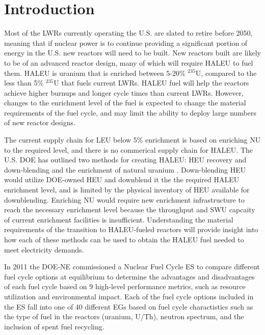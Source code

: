\section{Introduction}

Most of the \glspl{LWR} currently operating the U.S. are slated to retire
before 2050, meaning that if nuclear power is to continue providing a 
significant portion of energy in the U.S. new reactors will need to be built. 
New reactors built are likely to be of an advanced reactor design, many of 
which will require \gls{HALEU} to fuel them. \gls{HALEU} is uranium that 
is enriched between 5-20\% $^{235}$U, compared to the less than 5\% $^{235}$U 
that fuels current \glspl{LWR}. \gls{HALEU} fuel will help 
the reactors achieve higher burnups and longer cycle times than current 
\glspl{LWR}. However, changes to the enrichment level of the fuel is expected 
to change the material requirements of the fuel cycle, and may limit the 
ability to deploy large numbers of new reactor designs. 

The current supply chain for \gls{LEU} below 5\% enrichment is based on 
enriching \gls{NU} to the required level, and there is no commerical 
supply chain for \gls{HALEU}. The U.S. \gls{DOE} has outlined 
two methods for creating \gls{HALEU}: \gls{HEU} recovery and down-blending 
and the enrichment of natural uranium \cite{griffith_overview_2020}. 
Down-blending \gls{HEU} would utilize \gls{DOE}-owned \gls{HEU} and 
downblend it the the required \gls{HALEU} enrichment level, and is 
limited by the physical inventory of \gls{HEU} available for downblending. 
Enriching \gls{NU} would require new enrichment infrastructure to 
reach the necessary enrichment level because the throughput and \gls{SWU} 
capcaity of current enrichment facilities is insufficient. Understanding the 
material requirements of the transition to \gls{HALEU}-fueled 
reactors will provide insight into how each of these methods can be used 
to obtain the \gls{HALEU} fuel needed to meet electricity demands.

In 2011 the \gls{DOE-NE} commissioned a Nuclear Fuel Cycle \gls{ES} 
\cite{wigeland_nuclear_2014} to compare different fuel cycle options at 
equilibrium to determine the advantages and disadvantages of each fuel cycle 
based on 9 high-level performance metrics, such as resource utilization and 
environmental impact. Each of the fuel cycle options included in the 
\gls{ES} fall into one of 40 different \glspl{EG} based on fuel 
cycle charactistics such as the type of fuel in the reactors (uranium, 
U/Th), neutron spectrum, and the inclusion of spent fuel recycling. 

